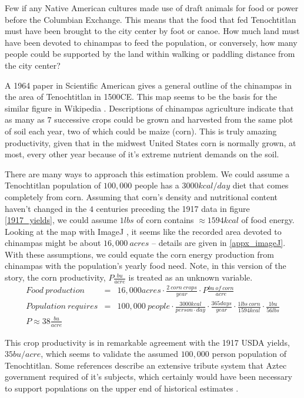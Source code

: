 \documentclass[12pt]{iopart}
\newcommand{\bea}{\begin{eqnarray}}
\newcommand{\eea}{\end{eqnarray}}
\begin{document}
Few if any Native American cultures made use of draft animals for food or power before the Columbian Exchange.  This means that the food that fed Tenochtitlan must have been brought to the city center by foot or canoe.  How much land must have been devoted to chinampas to feed the population, or conversely, how many people could be supported by the land within walking or paddling distance from the city center?

A 1964 paper in Scientific American \cite{Chinampas_1964} gives a general outline of the chinampas in the area of Tenochtitlan in 1500CE.  This map seems to be the basis for the similar figure in Wikipedia \cite{chinampas_wikipedia}.  Descriptions of chinampas agriculture indicate that as many as $7$ successive crops could be grown and harvested from the same plot of soil each year, two of which could be maize (corn).  This is truly amazing productivity, given that in the midwest United States corn is normally grown, at most, every other year because of it's extreme nutrient demands on the soil.

There are many ways to approach this estimation problem.  We could assume a Tenochtitlan population of $100,000$ people has a $3000kcal/day$ diet that comes completely from corn.  Assuming that corn's density and nutritional content haven't changed in the $4$ centuries preceding the 1917 data in figure \ref{1917_yields}, we could assume $1lbs$ of corn contains $\approx1594kcal$ of food energy.  
Looking at the map with ImageJ \cite{imageJ}, it seems like the recorded area devoted to chinampas might be about
$16,000~acres$ -- details are given in \ref{appx_imageJ}.
With these assumptions, we could equate the corn energy production from chinampas with the population's yearly food need. Note, in this version of the story, the corn productivity, $P\frac{bu}{acre}$ is treated as an unknown variable.  
\bea
Food~production &=& 16,000acres\cdot \frac{2~corn~crops}{year}\cdot P \frac{bu~of~corn}{acre} \nonumber \\
Population~requires &=& 100,000~people\cdot \frac{3000kcal}{person\cdot day}\cdot\frac{365days}{year}\cdot\frac{1lbs~corn}{1594kcal}\cdot\frac{1bu}{56lbs} \nonumber \\
P \approx 38\frac{bu}{acre} && 
\eea

This crop productivity is in remarkable agreement with the 1917 USDA yields, $35bu/acre$, which seems to validate the assumed $100,000$ person population of Tenochtitlan.  Some references \cite{Chinampas_1964} describe an extensive tribute system that Aztec government required of it's subjects, which certainly would have been necessary to support populations on the upper end of historical estimates \cite{400k}.
\end{document}
